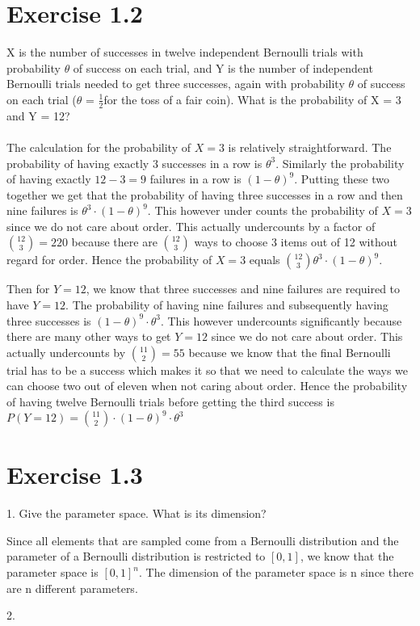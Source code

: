 \documentclass[a4paper,11pt]{article}
\newcommand{\1}[1]{\,I_{#1}} %
\begin{document}
\section{Exercise 1.2}
X is the number of successes in twelve independent Bernoulli trials with probability $\theta$ of success on each trial, and Y is the number of independent Bernoulli trials needed to get three successes, again with probability $\theta$ of success on each trial ($\theta$ = $\frac{1}{2} $for the toss of a fair coin). What is the probability of X = 3 and Y = 12?
\\ \\
The calculation for the probability of $X=3$ is relatively straightforward. The probability of having exactly 3 successes in a row is $\theta^3$. Similarly the probability of having exactly $12-3 = 9$ failures in a row is $(1-\theta)^9$. Putting these two together we get that the probability of having three successes in a row and then nine failures is $\theta^3 \cdot(1-\theta)^9$. This however under counts the probability of $X=3$ since we do not care about order. This actually undercounts by a factor of $\binom{12}{3} = 220$ because there are $\binom{12}{3}$ ways to choose 3 items out of 12 without regard for order. Hence the probability of $X = 3$ equals $\binom{12}{3}\theta^3 \cdot (1 - \theta)^9$.

Then for $Y=12$, we know that three successes and nine failures are required to have $Y = 12$. The probability of having nine failures and subsequently having three successes is $(1-\theta)^9 \cdot \theta^3$. This however undercounts significantly because there are many other ways to get $Y=12$ since we do not care about order. This actually undercounts by $\binom{11}{2} = 55$ because we know that the final Bernoulli trial has to be a success which makes it so that we need to calculate the ways we can choose two out of eleven when not caring about order. Hence the probability of having twelve Bernoulli trials before getting the third success is $P(Y = 12) = \binom{11}{2} \cdot (1-\theta)^9 \cdot \theta^3$


\section{Exercise 1.3}

1. Give the parameter space. What is its dimension?

Since all elements that are sampled come from a Bernoulli distribution and the parameter of a Bernoulli distribution is restricted to $[0,1]$, we know that the parameter space is $[0, 1]^n$. The dimension of the parameter space is n since there are n different parameters. %

2. 
\end{document}
